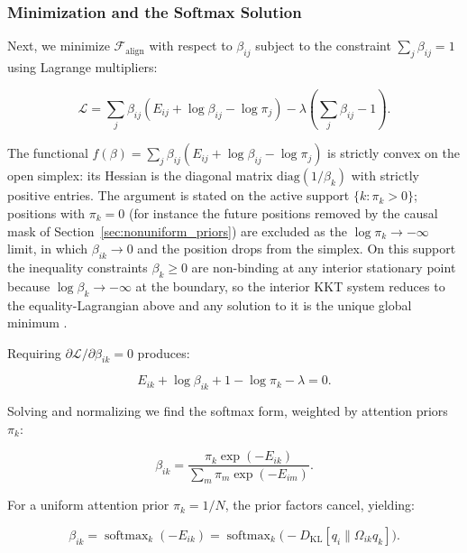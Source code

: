 \documentclass[twoside,11pt]{article}
\begin{document}
\subsubsection{Minimization and the Softmax Solution}

Next, we minimize $\mathcal{F}_{\text{align}}$ with respect to $\beta_{ij}$ subject to the constraint $\sum_j \beta_{ij} = 1$ using Lagrange multipliers:

\begin{equation}
\mathcal{L} = \sum_j \beta_{ij}(E_{ij} + \log \beta_{ij} - \log \pi_j) - \lambda\left(\sum_j \beta_{ij} - 1\right).
\end{equation}

The functional $f(\beta) = \sum_j \beta_{ij}(E_{ij} + \log\beta_{ij} - \log\pi_j)$ is strictly convex on the open simplex: its Hessian is the diagonal matrix $\mathrm{diag}(1/\beta_k)$ with strictly positive entries. The argument is stated on the active support $\{k : \pi_k > 0\}$; positions with $\pi_k = 0$ (for instance the future positions removed by the causal mask of Section~\ref{sec:nonuniform_priors}) are excluded as the $\log\pi_k \to -\infty$ limit, in which $\beta_{ik} \to 0$ and the position drops from the simplex. On this support the inequality constraints $\beta_k \geq 0$ are non-binding at any interior stationary point because $\log\beta_k \to -\infty$ at the boundary, so the interior KKT system reduces to the equality-Lagrangian above and any solution to it is the unique global minimum \citep{Boyd2004, Wainwright2008}.

Requiring $\partial \mathcal{L} / \partial \beta_{ik} = 0$ produces:

\begin{equation}
E_{ik} + \log \beta_{ik} + 1 - \log \pi_k - \lambda = 0.
\end{equation}

Solving and normalizing we find the softmax form, weighted by attention priors $\pi_k$:

\begin{equation}
\beta_{ik} = \frac{\pi_k \exp(-E_{ik})}{\sum_m \pi_m \exp(-E_{im})}.
\label{eq:mixture_softmax_general}
\end{equation}

For a uniform attention prior $\pi_k = 1/N$, the prior factors cancel, yielding:

\begin{equation}
\boxed{\beta_{ik} = \operatorname{softmax}_k(-E_{ik}) = \operatorname{softmax}_k \big(-D_{\mathrm{KL}}[q_i \| \Omega_{ik} q_k]\big).}
\label{eq:mixture_softmax}
\end{equation}
\end{document}
